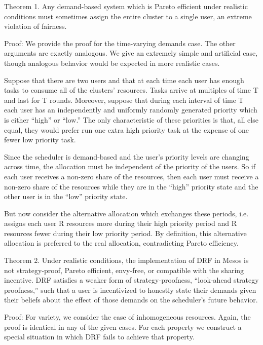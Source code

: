 \documentclass{acm_proc_article-sp}
\begin{document}
Theorem 1. Any demand-based system which is Pareto efficient under realistic conditions must sometimes assign the entire cluster to a single user, an extreme violation of fairness.

Proof: We provide the proof for the time-varying demands case. The other arguments are exactly analogous. We give an extremely simple and artificial case, though analogous behavior would be expected in more realistic cases.

Suppose that there are two users and that at each time each user has enough tasks to consume all of the clusters’ resources. Tasks arrive at multiples of time T and last for T rounds. Moreover, suppose that during each interval of time T each user has an independently and uniformly randomly generated priority which is either “high” or “low.” The only characteristic of these priorities is that, all else equal, they would prefer run one extra high priority task at the expense of one fewer low priority task.

Since the scheduler is demand-based and the user’s priority levels are changing across time, the allocation must be independent of the priority of the users. So if each user receives a non-zero share of the resources, then each user must receive a non-zero share of the resources while they are in the “high” priority state and the other user is in the “low” priority state. 

But now consider the alternative allocation which exchanges these periods, i.e. assigns each user R resources more during their high priority period and R resources fewer during their low priority period. By definition, this alternative allocation is preferred to the real allocation, contradicting Pareto efficiency.

Theorem 2. Under realistic conditions, the implementation of DRF in Mesos is not strategy-proof, Pareto efficient, envy-free, or compatible with the sharing incentive. DRF satisfies a weaker form of strategy-proofness, “look-ahead strategy proofness,” such that a user is incentivized to honestly state their demands given their beliefs about the effect of those demands on the scheduler’s future behavior. 

Proof: For variety, we consider the case of inhomogeneous resources. Again, the proof is identical in any of the given cases. For each property we construct a special situation in which DRF fails to achieve that property.
\end{document}
